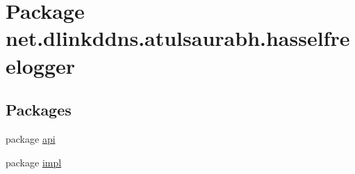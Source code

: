 \hypertarget{namespacenet_1_1dlinkddns_1_1atulsaurabh_1_1hasselfreelogger}{}\section{Package net.\+dlinkddns.\+atulsaurabh.\+hasselfreelogger}
\label{namespacenet_1_1dlinkddns_1_1atulsaurabh_1_1hasselfreelogger}
\subsection*{Packages}
\begin{DoxyCompactItemize}
\item 
package \mbox{\hyperlink{namespacenet_1_1dlinkddns_1_1atulsaurabh_1_1hasselfreelogger_1_1api}{api}}
\item 
package \mbox{\hyperlink{namespacenet_1_1dlinkddns_1_1atulsaurabh_1_1hasselfreelogger_1_1impl}{impl}}
\end{DoxyCompactItemize}
